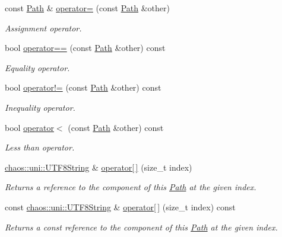 \begin{DoxyCompactItemize}
const \hyperlink{classchaos_1_1io_1_1sys_1_1_path}{Path} \& \hyperlink{classchaos_1_1io_1_1sys_1_1_path_a45c70fc34ff619e890d5bc807dd70d8b}{operator=} (const \hyperlink{classchaos_1_1io_1_1sys_1_1_path}{Path} \&other)
\begin{DoxyCompactList}\small\item\em Assignment operator. \end{DoxyCompactList}\item 
bool \hyperlink{classchaos_1_1io_1_1sys_1_1_path_ac2e63307a0526625f4447f1d2a704e3b}{operator==} (const \hyperlink{classchaos_1_1io_1_1sys_1_1_path}{Path} \&other) const 
\begin{DoxyCompactList}\small\item\em Equality operator. \end{DoxyCompactList}\item 
bool \hyperlink{classchaos_1_1io_1_1sys_1_1_path_acd6dea0a797c0307179a5523239a299a}{operator!=} (const \hyperlink{classchaos_1_1io_1_1sys_1_1_path}{Path} \&other) const 
\begin{DoxyCompactList}\small\item\em Inequality operator. \end{DoxyCompactList}\item 
bool \hyperlink{classchaos_1_1io_1_1sys_1_1_path_a90858bbce348d5b36d0c31d771c601d8}{operator$<$} (const \hyperlink{classchaos_1_1io_1_1sys_1_1_path}{Path} \&other) const 
\begin{DoxyCompactList}\small\item\em Less than operator. \end{DoxyCompactList}\item 
\hyperlink{classchaos_1_1uni_1_1_u_t_f8_string}{chaos\-::uni\-::\-U\-T\-F8\-String} \& \hyperlink{classchaos_1_1io_1_1sys_1_1_path_ae7503e76ec85786225fc25b572deaeea}{operator\mbox{[}$\,$\mbox{]}} (size\-\_\-t index)
\begin{DoxyCompactList}\small\item\em Returns a reference to the component of this \hyperlink{classchaos_1_1io_1_1sys_1_1_path}{Path} at the given index. \end{DoxyCompactList}\item 
const \hyperlink{classchaos_1_1uni_1_1_u_t_f8_string}{chaos\-::uni\-::\-U\-T\-F8\-String} \& \hyperlink{classchaos_1_1io_1_1sys_1_1_path_aa3ee2fea4946e94c9bdb692bdffed522}{operator\mbox{[}$\,$\mbox{]}} (size\-\_\-t index) const 
\begin{DoxyCompactList}\small\item\em Returns a const reference to the component of this \hyperlink{classchaos_1_1io_1_1sys_1_1_path}{Path} at the given index. \end{DoxyCompactList}\item 

\end{DoxyCompactItemize}
